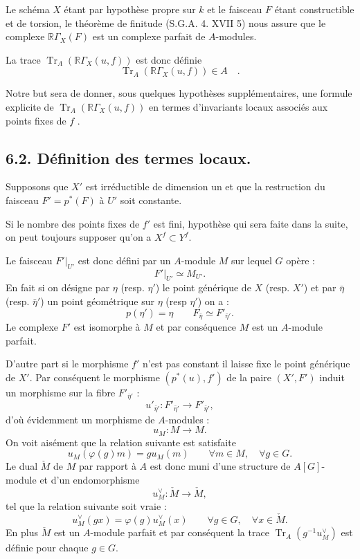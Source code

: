 \documentclass[11pt]{article}
\newcommand{\R}{\mathbb{R}}\newcommand{\RHomCore}{\mathbb{R}\mathrm{Hom}}
\providecommand{\Tr}{\operatorname{Tr}}
\providecommand{\Tr}{\operatorname{Tr}}
\providecommand{\Tr}{\operatorname{Tr}}
\providecommand{\R}{\mathrm R}
\providecommand{\Tr}{\operatorname{Tr}}
\providecommand{\Tr}{\operatorname{Tr}}
\begin{document}
Le schéma $X$ étant par hypothèse propre sur $k$ et le faisceau $F$ étant constructible et de torsion, le théorème de finitude (S.G.A. 4. XVII 5) nous assure que le complexe $\R\Gamma_X(F)$ est un complexe parfait de $A$-modules.

La trace $\Tr_A(\R\Gamma_X(u, f))$ est donc définie
\[
\Tr_A(\R\Gamma_X(u, f)) \in A \quad .
\]

Notre but sera de donner, sous quelques hypothèses supplémentaires, une formule explicite de $\Tr_A(\R\Gamma_X(u, f))$ en termes d'invariants locaux associés aux points fixes de $f$ .

\bigskip

\subsection*{6.2. Définition des termes locaux.}
Supposons que $X'$ est irréductible de dimension un et que la restruction du faisceau $F'=p^*(F)$ à $U'$ soit constante.

Si le nombre des points fixes de $f'$ est fini, hypothèse qui sera faite dans la suite, on peut toujours supposer qu'on a $X^f \subset Y^f$.

Le faisceau $F'|_{U'}$ est donc défini par un $A$-module $M$ sur lequel $G$ opère :
\[
F'|_{U'} \simeq M_{U'} .
\]
En fait si on désigne par $\eta$ (resp. $\eta'$) le point générique de $X$ (resp. $X'$) et par $\bar\eta$ (resp. $\bar\eta'$) un point géométrique sur $\eta$ (resp $\eta'$) on a :
\[
p(\eta')=\eta\qquad F_{\bar\eta} \simeq F'_{\bar\eta'} .
\]
Le complexe $F'$ est isomorphe à $M$ et par conséquence $M$ est un $A$-module parfait.

D'autre part si le morphisme $f'$ n'est pas constant il laisse fixe le point générique de $X'$. Par conséquent le morphisme $(p^*(u),f')$ de la paire $(X',F')$ induit un morphisme sur la fibre $F'_{\bar\eta'}$ :
\[
u'_{\bar\eta'}:F'_{\bar\eta'}\longrightarrow F'_{\bar\eta'} ,
\]
d'où évidemment un morphisme de $A$-modules :
\[
u_M:M\longrightarrow M .
\]
On
voit aisément que la relation suivante est satisfaite
\begin{equation}\tag{6.2.1}
u_M(\varphi(g)m)=g u_M(m) \qquad \forall m\in M,\quad \forall g\in G .
\end{equation}
Le dual $\check{M}$ de $M$ par rapport à $A$ est donc muni d'une structure de $A[G]$-module et d'un endomorphisme
\[
u_M^\vee:\check{M}\longrightarrow \check{M} ,
\]
tel que la relation suivante soit vraie :
\[
u_M^\vee(gx)=\varphi(g)u_M^\vee(x) \qquad \forall g\in G,\quad \forall x\in \check{M} .
\]
En plus $\check{M}$ est un $A$-module parfait et par conséquent la trace $\Tr_A(g^{-1}u_M^\vee)$ est définie pour chaque $g\in G$.
\end{document}

